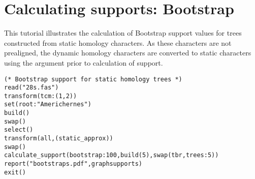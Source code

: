 
\section{Calculating supports: Bootstrap}{\label{tutorial6}}

This tutorial illustrates the calculation of Bootstrap support values for trees constructed from static homology characters. 
As these characters are not prealigned, the dynamic homology characters are converted to static 
characters using the argument  prior to calculation of support.

\begin{verbatim}
(* Bootstrap support for static homology trees *)
read("28s.fas")
transform(tcm:(1,2))
set(root:"Americhernes")
build()
swap()
select()
transform(all,(static_approx))
swap()
calculate_support(bootstrap:100,build(5),swap(tbr,trees:5))
report("bootstraps.pdf",graphsupports)
exit()
\end{verbatim}

